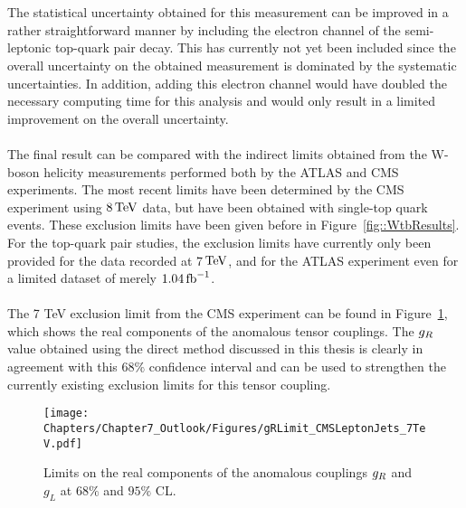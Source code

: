 \\
\\
The statistical uncertainty obtained for this measurement can be improved in a rather straightforward manner by including the electron channel of the semi-leptonic top-quark pair decay.
This has currently not yet been included since the overall uncertainty on the obtained measurement is dominated by the systematic uncertainties. In addition, adding this electron channel would have doubled the necessary computing time for this analysis and would only result in a limited improvement on the overall uncertainty.
\\
\\
The final result can be compared with the indirect limits obtained from the W-boson helicity measurements performed both by the ATLAS and CMS experiments.
The most recent limits have been determined by the CMS experiment using $8 \, \mathrm{TeV}$ data, but have been obtained with single-top quark events.
These exclusion limits have been given before in Figure~\ref{fig::WtbResults}.
For the top-quark pair studies, the exclusion limits have currently only been provided for the data recorded at 7$\, \mathrm{TeV}$, and for the ATLAS experiment even for a limited dataset of merely $1.04 \, \mathrm{fb}^{-1}$.
\\
\\
The 7 TeV exclusion limit from the CMS experiment can be found in Figure~\ref{fig::gRLimitConc}, which shows the real components of the anomalous tensor couplings.
The $g_{R}$ value obtained using the direct method discussed in this thesis is clearly in agreement with this $68 \%$ confidence interval and can be used to strengthen the currently existing exclusion limits for this tensor coupling.
\begin{figure}[h!tp]
 \centering
 \texttt{[image: Chapters/Chapter7\_Outlook/Figures/gRLimit\_CMSLeptonJets\_7TeV.pdf]}
 \caption{Limits on the real components of the anomalous couplings $g_{R}$ and $g_L$ at $68 \%$ and $95 \%$ CL.} \label{fig::gRLimitConc}
\end{figure}


